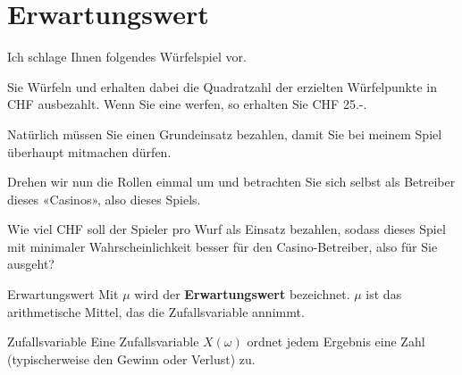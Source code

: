 \section{Erwartungswert}

Ich schlage Ihnen folgendes Würfelspiel vor.

Sie Würfeln und erhalten dabei die Quadratzahl der erzielten
Würfelpunkte in CHF ausbezahlt. Wenn Sie \zB eine  werfen,
so erhalten Sie CHF 25.-.

Natürlich müssen Sie einen Grundeinsatz bezahlen, damit Sie bei meinem
Spiel überhaupt mitmachen dürfen.

Drehen wir nun die Rollen einmal um und betrachten Sie sich selbst als
Betreiber dieses «Casinos», also dieses Spiels.

Wie viel CHF soll der Spieler pro Wurf als Einsatz bezahlen, sodass
dieses Spiel mit minimaler Wahrscheinlichkeit besser für den
Casino-Betreiber, also für Sie ausgeht?




  \begin{definition}{Erwartungswert}{}
    Mit $\mu$ wird der \textbf{Erwartungswert} bezeichnet.
    $\mu$ ist das arithmetische Mittel, das die Zufallsvariable
    annimmt.
  \end{definition}

  \begin{definition}{Zufallsvariable}{}
    Eine Zufallsvariable $X(\omega)$ ordnet jedem Ergebnis eine Zahl
    (typischerweise den Gewinn oder Verlust) zu.
    \end{definition}
\newpage
